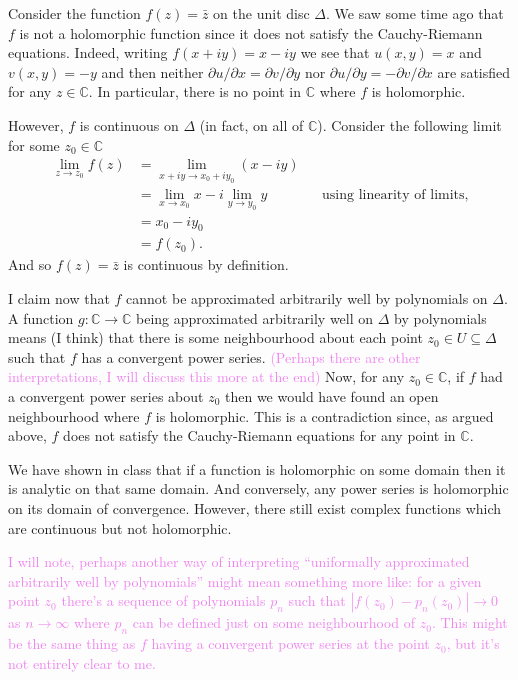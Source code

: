 \documentclass[12pt,letterpaper,boxed]{hmcpset}
\newcommand{\wg}[1]{\textcolor{violet}{#1}}
\newcommand{\C}{\mathbb C}
\newcommand{\abs}[1]{\left|#1\right|}
\begin{document}
\begin{solution}
Consider the function $f(z) = \bar z$ on the unit disc $\Delta$. 
We saw some time ago that $f$ is not a holomorphic function since 
it does not satisfy the Cauchy-Riemann equations.
Indeed, writing $f(x+iy) = x - iy$ we see that $u(x,y) = x$ and
$v(x,y) = -y$ and then neither $\partial u/\partial x = \partial v /
\partial y$ nor $\partial u / \partial y = - \partial v / \partial x$
are satisfied for any $z \in \C$. In particular, there is no 
point in $\C$ where $f$ is holomorphic. 

However, $f$ is continuous on $\Delta$ (in fact, on all of $\C$).
Consider the following limit for some $z_0 \in \C$
\begin{align*}
	\lim_{z \to z_0} f(z) &= \lim_{x + iy \to x_0 + i y_0} (x - iy) \\
		&= \lim_{x \to x_0} x - i \lim_{y \to y_0} y && \text{using linearity of limits,} \\
		&= x_0 - i y_0 \\
		&= f(z_0).
\end{align*}
And so $f(z) = \bar z$ is continuous by definition. 

I claim now that $f$ cannot be approximated arbitrarily well 
by polynomials on $\Delta$. A function $g: \C \to \C$ 
being approximated arbitrarily
well on $\Delta$ by polynomials means (I think) that there is some 
neighbourhood about each point $z_0 \in U \subseteq \Delta$ such that 
$f$ has a convergent power series. 
\wg{(Perhaps there are other interpretations, 
I will discuss this more at the end)}
Now, for any $z_0 \in \C$, if $f$ had a convergent power series about
$z_0$ then we would have found an open neighbourhood 
where $f$ is holomorphic. This is a contradiction since, as argued above,
$f$ does not satisfy the Cauchy-Riemann equations for any 
point in $\C$.

We have shown in class that if a function is holomorphic on some domain
then it is analytic on that same domain. And conversely, any power
series is holomorphic on its domain of convergence. However, 
there still exist complex functions which are continuous but not
holomorphic.

\wg{I will note, perhaps another way of interpreting 
``uniformally approximated arbitrarily well by polynomials''
might mean something more like: for a given point $z_0$ there's a sequence of polynomials
$p_n$ such that $\abs{f(z_0) - p_n(z_0)} \to 0$ as $n \to \infty$
where $p_n$ can be defined just on some neighbourhood of $z_0$.
This might be the same thing as $f$ having a convergent power series 
at the point $z_0$, but it's not entirely clear to me.
}


\end{solution}

\newpage
\end{document}
